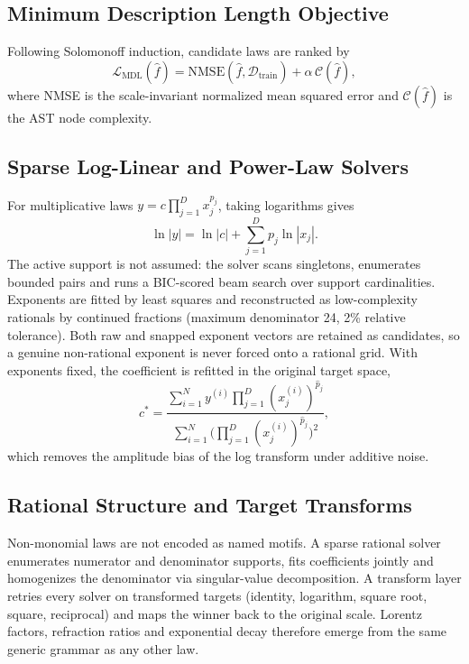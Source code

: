 \documentclass[10pt,journal,compsoc]{IEEEtran}
\begin{document}
\subsection{Minimum Description Length Objective}
Following Solomonoff induction, candidate laws are ranked by
\begin{equation}
\mathcal{L}_{\text{MDL}}(\hat{f}) = \text{NMSE}(\hat{f}, \mathcal{D}_{\text{train}}) + \alpha\,\mathcal{C}(\hat{f}),
\end{equation}
where NMSE is the scale-invariant normalized mean squared error and $\mathcal{C}(\hat{f})$ is the AST node complexity.

\subsection{Sparse Log-Linear and Power-Law Solvers}
For multiplicative laws $y = c\prod_{j=1}^D x_j^{p_j}$, taking logarithms gives
\begin{equation}
\ln |y| = \ln |c| + \sum_{j=1}^D p_j \ln |x_j|.
\end{equation}
The active support is not assumed: the solver scans singletons, enumerates bounded pairs and runs a BIC-scored beam search over support cardinalities. Exponents are fitted by least squares and reconstructed as low-complexity rationals by continued fractions (maximum denominator 24, 2\% relative tolerance). Both raw and snapped exponent vectors are retained as candidates, so a genuine non-rational exponent is never forced onto a rational grid. With exponents fixed, the coefficient is refitted in the original target space,
\begin{equation}
c^* = \frac{\sum_{i=1}^N y^{(i)} \prod_{j=1}^D (x_j^{(i)})^{\hat{p}_j}}{\sum_{i=1}^N \big(\prod_{j=1}^D (x_j^{(i)})^{\hat{p}_j}\big)^2},
\end{equation}
which removes the amplitude bias of the log transform under additive noise.

\subsection{Rational Structure and Target Transforms}
Non-monomial laws are not encoded as named motifs. A sparse rational solver enumerates numerator and denominator supports, fits coefficients jointly and homogenizes the denominator via singular-value decomposition. A transform layer retries every solver on transformed targets (identity, logarithm, square root, square, reciprocal) and maps the winner back to the original scale. Lorentz factors, refraction ratios and exponential decay therefore emerge from the same generic grammar as any other law.
\end{document}
